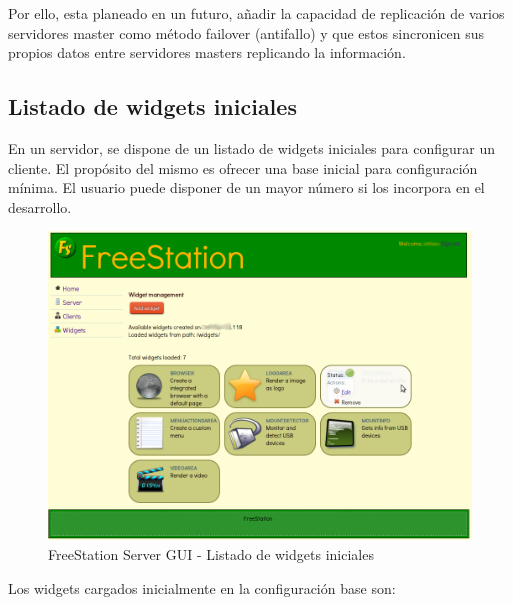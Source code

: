 Por ello, esta planeado en un futuro, añadir la capacidad de replicación de
varios servidores master como método failover (antifallo) y que estos
sincronicen sus propios datos entre servidores masters replicando la
información.

\subsection{Listado de widgets iniciales}

En un servidor, se dispone de un listado de widgets iniciales
para configurar un cliente. El propósito del mismo es ofrecer una base inicial
para configuración mínima. El usuario puede disponer de un mayor número si los
incorpora en el desarrollo.

\begin{figure}[ht]
    \begin{center}
        \includegraphics[scale=0.45]{src/img/freestation-server-widgets.png}
        \caption[FreeStation Server GUI - Listado de widgets iniciales] {FreeStation
        Server GUI - Listado de widgets iniciales}
    \end{center}
\end{figure}

\newpage

Los widgets cargados inicialmente en la configuración base son:

